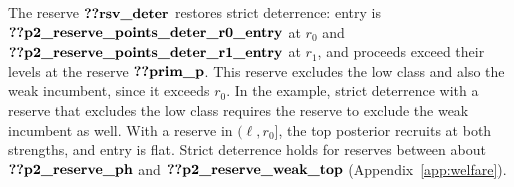 The reserve \(\reg{rsv_deter}\) restores strict deterrence: entry is \(\reg{p2_reserve_points_deter_r0_entry}\) at
\(r_0\) and \(\reg{p2_reserve_points_deter_r1_entry}\) at \(r_1\), and proceeds exceed their levels at the reserve
\(\reg{prim_p}\). This reserve excludes the low class and also the weak incumbent, since it exceeds \(r_0\). In the
example, strict deterrence with a reserve that excludes the low class requires the reserve to exclude the weak
incumbent as well. With a reserve in
\((\ell,r_0]\), the top posterior recruits at both strengths, and entry is flat. Strict deterrence holds for reserves
between about \(\reg{p2_reserve_ph}\) and \(\reg{p2_reserve_weak_top}\)
(Appendix~\ref{app:welfare}).
